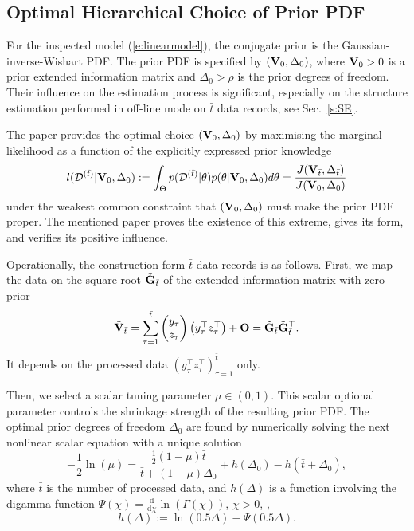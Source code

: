 \subsection{Optimal Hierarchical Choice of Prior PDF}\label{s:prior}
For the inspected model (\ref{e:linearmodel}), the conjugate prior is the Gaussian-inverse-Wishart PDF. The prior PDF is specified by $(\mathbf{V}_{0}, \Delta_{0})$, where $\mathbf{V}_{0} > 0$ is a prior extended information matrix and  $\Delta_{0} > \rho$  is the prior degrees of freedom. Their influence
on the estimation process is significant, especially on the structure estimation performed in off-line mode on $\bar{t}$ data records, see Sec.\ \ref{s:SE}.

The paper \cite{Kar:25a} provides the optimal choice $({\mathbf{V}}_{0}, {\Delta}_{0})$ by maximising the marginal likelihood as a function of the explicitly expressed prior knowledge
\begin{equation*}
l(\mathcal{D}^{(\bar{t})}|\mathbf{V}_{0}, \Delta_{0}) := \int_{\Theta}p(\mathcal{D}^{(\bar{t})}|\theta)p(\theta|\mathbf{V}_{0},\Delta_{0})d\theta=
\frac{J(\mathbf{V}_{\bar{t}},\Delta_{\bar{t}})}{J(\mathbf{V}_{0},\Delta_{0})}
\end{equation*}
under the weakest common constraint that $(\mathbf{V}_{0}, \Delta_{0})$ must make the prior PDF proper. The mentioned paper proves the existence of this extreme, gives its form, and verifies its positive influence.

Operationally, the construction form $\bar{t}$ data records is as follows. First, we map the data on the square root $\tilde{\mathbf{G}}_{\bar{t}}$ of the extended information matrix with zero prior
\begin{equation*}
\tilde{\mathbf{V}}_{\bar{t}} = \sum_{\tau=1}^{\bar{t}} \begin{pmatrix}
    y_{\tau}\\ z_{\tau}
\end{pmatrix}\begin{pmatrix}
    y_{\tau}^{\top}  z_{\tau}^{\top}
\end{pmatrix} + \mathbf{O}=\tilde{\mathbf{G}}_{\bar{t}}\tilde{\mathbf{G}}_{\bar{t}}^{\top}.
\end{equation*}
It depends on the processed data $( y_{\tau}^{\top}  z_{\tau}^{\top})_{\tau=1}^{\bar{t}}$ only.

Then, we select a scalar tuning parameter $\mu \in (0, 1)$. This scalar optional parameter controls the shrinkage strength of the resulting prior PDF. The optimal prior degrees of freedom $\Delta_{0}$ are found by numerically solving the next nonlinear scalar equation with a unique solution
\begin{equation*}
-\frac{1}{2} \ln(\mu) = \frac{\frac{1}{2}(1 - \mu)\bar{t}}{ \bar{t} + (1 - \mu)\Delta_{0}} + h(\Delta_{0}) - h(\bar{t} + \Delta_{0}),
\end{equation*}
where $\bar{t}$ is the number of processed data, and $h(\Delta)$ is a function involving the digamma function $\Psi(\chi) = \frac{\mathrm{d}}{\mathrm{d}\chi}\ln(\Gamma(\chi))$, $\chi>0$, \cite{AbrSte:72},
\begin{equation*}
h(\Delta) := \ln(0.5\Delta) - \Psi(0.5\Delta).
\end{equation*}


